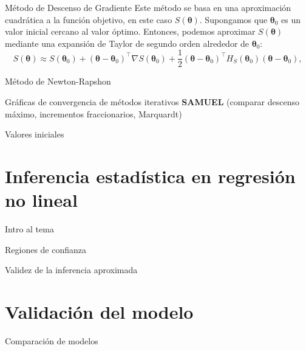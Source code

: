 \documentclass[aspectratio = 169, spanish]{beamer}
\begin{document}
\begin{frame}{Método de Descenso de Gradiente}
Este método se basa en una aproximación cuadrática a la función objetivo, en este caso $S(\bm{\theta})$. Supongamos que $\bm{\theta}_0$ es un valor inicial cercano al valor óptimo. Entonces, podemos aproximar $S(\bm{\theta})$ mediante una expansión de Taylor de segundo orden alrededor de $\bm{\theta}_0$:
\[
S(\bm{\theta}) \approx S(\bm{\theta}_0) + (\bm{\theta} - \bm{\theta}_0)^\top \nabla S(\bm{\theta}_0) + \frac{1}{2} (\bm{\theta} - \bm{\theta}_0)^\top H_S(\bm{\theta}_0) (\bm{\theta} - \bm{\theta}_0),
\]
\end{frame}

\begin{frame}{Método de Newton-Rapshon}
\end{frame}

\begin{frame}
    Gráficas de convergencia de métodos iterativos \textbf{SAMUEL} (comparar descenso máximo, incrementos fraccionarios, Marquardt)
\end{frame}

\begin{frame}{Valores iniciales}
    
\end{frame}

\section{Inferencia estadística en regresión no lineal}

\begin{frame}
    Intro al tema
\end{frame}

\begin{frame}{Regiones de confianza}
    
\end{frame}

\begin{frame}{Validez de la inferencia aproximada}
    
\end{frame}

\section{Validación del modelo}

\begin{frame}{Comparación de modelos}
    
\end{frame}
\end{document}
